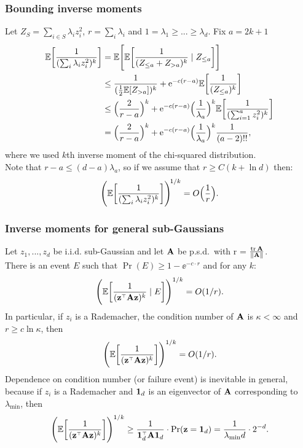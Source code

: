 \documentclass[10pt]{beamer}
\begin{document}
\begin{frame}
  \frametitle{Bounding inverse moments}
  Let $Z_S=\sum_{i\in S}\lambda_iz_i^2$, $r=\sum_i\lambda_i$
  and  $1=\lambda_1\geq ...\geq\lambda_d$. Fix $a=2k+1$
  \begin{align*}
    \mathbb E\bigg[\frac1{(\sum_i\lambda_iz_i^2)^k}\bigg]
    &=\mathbb E\Bigg[\mathbb E\bigg[
      \frac1{(Z_{\leq a}  + Z_{>a})^k}\mid  Z_{\leq a}\bigg]\Bigg]\\
    &\leq \frac1{(\frac12\mathbb E[Z_{>a}])^k} +
      \mathrm{e}^{-c(r-a)}\mathbb E\bigg[\frac1{(Z_{\leq a})^k}\bigg]\\
    &\leq \Big(\frac 2{r-a}\Big)^k +
      \mathrm{e}^{-c(r-a)}\Big(\frac{1}{\lambda_{a}}\Big)^k\mathbb E\bigg[\frac1{(\sum_{i=1}^{a}z_i^2)^k}\bigg]\\
    &=\Big(\frac 2{r-a}\Big)^k +
      \mathrm{e}^{-c(r-a)}\Big(\frac{1}{\lambda_{a}}\Big)^k\frac1{(a-2)!!},
  \end{align*}
  where we used $k$th inverse moment of the chi-squared
  distribution.\\
  Note that $r-a\leq (d-a)\lambda_a$, so if we assume
  that $r\geq C(k+\ln d)$ then:
  \begin{align*}
    \Bigg(\mathbb E\bigg[\frac1{(\sum_i\lambda_iz_i^2)^k}\bigg]\Bigg)^{\!1/k}=
    O\Big(\frac1r\Big).
  \end{align*}
  
\end{frame}

\begin{frame}
  \frametitle{Inverse moments for general sub-Gaussians}
  Let $z_1,...,z_d$ be i.i.d. sub-Gaussian and let $\mathbf A$ be
  p.s.d.~with r = $\frac{\mathrm{tr}\,\mathbf A}{\|\mathbf A\|}$.\\ 
There is an event $E$ such that $\Pr(E)\geq
1-\ee^{-c\cdot r}$ and for any $k$:
\begin{align*}
  \Bigg(\E\bigg[\frac1{(\z^\top\A\z)^k}\mid E\bigg]\Bigg)^{1/k}
  =O(1/r). 
\end{align*}
In particular, if $z_i$ is a Rademacher, the condition number of $\mathbf A$ is
$\kappa<\infty$ and $r\geq c\ln\kappa$, then
\begin{align*}
  \Bigg(\E\bigg[\frac1{(\z^\top\A\z)^k}\bigg]\Bigg)^{1/k}
  = O(1/r).
\end{align*}
Dependence on condition number (or failure event) is inevitable in general, because if
$z_i$ is a Rademacher and $\mathbf 1_d$ is an eigenvector of $\mathbf A$
corresponding to $\lambda_{\min}$, then
\begin{align*}
    \Bigg(\E\bigg[\frac1{(\z^\top\A\z)^k}\bigg]\Bigg)^{1/k}\geq
  \frac1{\one_d^\top\A\one_d}\cdot \Pr(\z = \one_d) =
  \frac1{\lambda_{\min}d}\cdot 2^{-d}.
\end{align*}
\end{frame}
\end{document}
